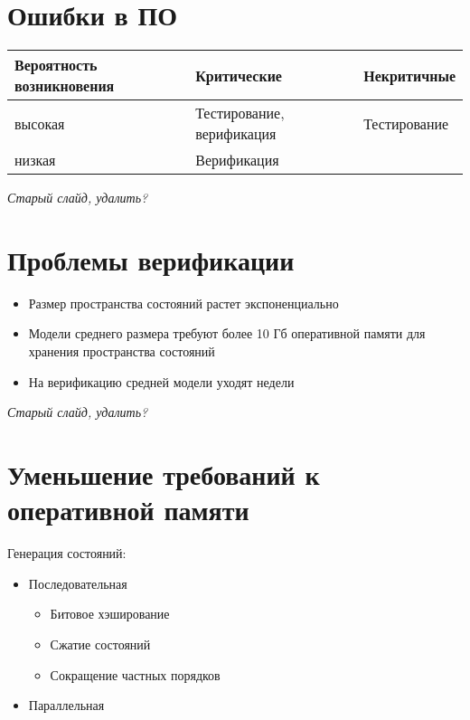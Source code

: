 \documentclass[12pt]{article}
\begin{document}
\TitleSlide

\section{Ошибки в ПО}
\label{sec:sw-errors}

\begin{tabular}[ht]{|p{}|p{}|p{}|}
  \hline 
  Вероятность возникновения & Критические & Некритичные \\
  \hline
  высокая & Тестирование, верификация & Тестирование \\
  \hline
  низкая & Верификация & \\
  \hline
\end{tabular}

\textit{Старый слайд, удалить?}

\section{Проблемы верификации}
\label{sec:verif-troubles}

\begin{itemize}
\item Размер пространства состояний растет экспоненциально

\item Модели среднего размера требуют более 10 Гб оперативной памяти для хранения пространства состояний

\item На верификацию средней модели уходят недели
\end{itemize}

\textit{Старый слайд, удалить?}

\section{Уменьшение требований к оперативной памяти}
\label{sec:ram-lightening}

Генерация состояний:

\begin{itemize}
\item Последовательная
  \begin{itemize}
  \item Битовое хэширование
  \item Сжатие состояний
  \item Сокращение частных порядков
  \end{itemize}
\item Параллельная
\end{itemize}
\end{document}

